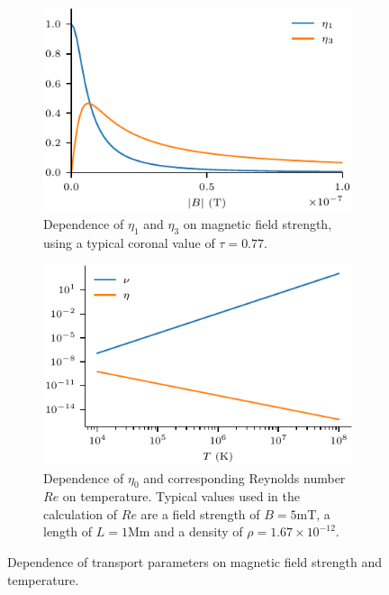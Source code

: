 \begin{figure}[t]
  \centering
    \begin{subfigure}{0.49\textwidth}
      \includegraphics[width=\linewidth]{brag_coeffs.pdf}
      \caption{Dependence of $\eta_1$ and $\eta_3$ on magnetic field strength, using a typical coronal value of $\tau = 0.77$.}
      \label{fig:brag_coeffs}
    \end{subfigure}
    \hfill
    \begin{subfigure}{0.49\textwidth}
      \includegraphics[width=\linewidth]{visc_dep_on_temp.pdf}
      \caption{Dependence of $\eta_0$ and corresponding Reynolds number $Re$ on temperature. Typical values used in the calculation of $Re$ are a field strength of $B = 5$mT, a length of $L = 1$Mm and a density of $\rho = 1.67 \times 10^{-12}$.}
      \label{fig:visc_dep_on_temp}
    \end{subfigure}
\caption{Dependence of transport parameters on magnetic field strength and temperature.}
\label{fig:visc_dep}%
\end{figure}

